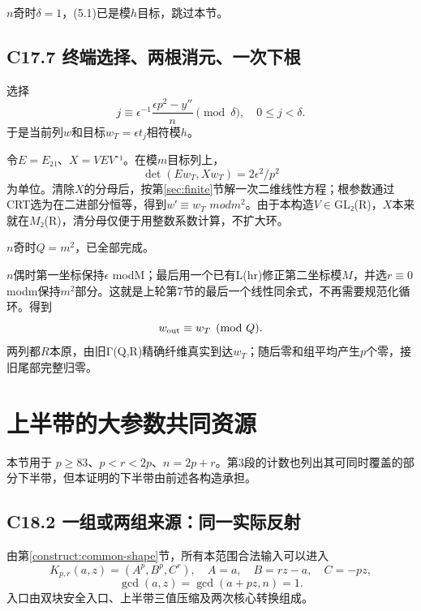 \documentclass[11pt,a4paper]{article}
\theoremstyle{definition}
\numberwithin{equation}{section}
\begin{document}
{\ensuremath{n}奇时\ensuremath{\delta =1}，(5.1)已是模\ensuremath{h}目标，跳过本节。}

\subsection*{\texorpdfstring{{C17.7} {终端选择、两根消元、一次下根}}{C17.7 终端选择、两根消元、一次下根}}\label{C17-h129}

{选择} \[
j\equiv\epsilon^{-1}\frac{\epsilon p^2-y''}{n}\pmod\delta,
\quad0\le j<\delta.
\] {于是当前列\ensuremath{w}和目标\ensuremath{w_{T}=\epsilon t_{j}}相符模\ensuremath{h}。}

{令\ensuremath{E=E}₂₁、\ensuremath{X=VEV}⁻¹。在模\ensuremath{m}目标列上，} \[
\det(Ew_T,Xw_T)=2\epsilon^2/p^2
\] {为单位。清除\ensuremath{X}的分母后，按}第\ref{sec:finite}节{解一次二维线性方程；根参数通过CRT选为在二进部分恒等，得到\ensuremath{w}′\ensuremath{\equiv}\ensuremath{w_{T}}} {\ensuremath{modm^{2}}。由于本构造\ensuremath{V}\ensuremath{\in}GL₂(R)，\ensuremath{X}本来就在\ensuremath{M}₂(R)，清分母仅便于用整数系数计算，不扩大环。}

{\ensuremath{n}奇时\ensuremath{Q=m^{2}}，已全部完成。}

{\ensuremath{n}偶时第一坐标保持\ensuremath{\epsilon }} {modM；最后用一个已有L(hr)修正第二坐标模\ensuremath{M}，并选\ensuremath{r}\ensuremath{\equiv}0} {modm保持\ensuremath{m^{2}}部分。这就是上轮第7节的最后一个线性同余式，不再需要规范化循环。得到} \[
w_{\rm out}\equiv w_T\pmod Q.
\] {两列都\ensuremath{R}本原，由旧Γ(Q,R)精确纤维真实到达\ensuremath{w_{T}}；随后零和组平均产生\ensuremath{p}个零，接旧尾部完整归零。}


\section{上半带的大参数共同资源}\label{construct:common-controller}
{本节用于} \(p\ge83\){、}\(p<r<2p\){、}\(n=2p+r\){。第3段的计数也列出其可同时覆盖的部分下半带，但本证明的下半带由前述各构造承担。}

\subsection*{\texorpdfstring{{C18.2} {一组或两组来源：同一实际反射}}{C18.2 一组或两组来源：同一实际反射}}\label{C18-h130}

{由}第\ref{construct:common-shape}节{，所有本范围合法输入可以进入} \[
K_{p,r}(a,z)=(A^p,B^p,C^r),\quad
A=a,\quad B=rz-a,\quad C=-pz,
\] \[
\gcd(a,z)=\gcd(a+pz,n)=1.
\] {入口由双块安全入口、上半带三值压缩及两次核心转换组成。}
\end{document}

